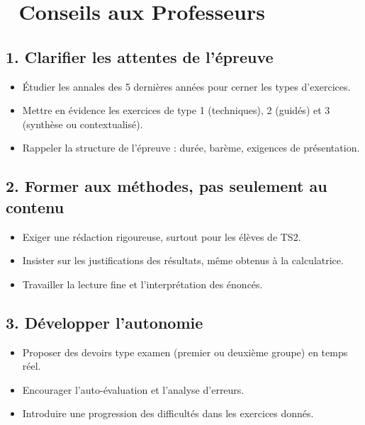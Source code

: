 








\section*{🔵 Conseils aux Professeurs}

\subsection*{1. Clarifier les attentes de l’épreuve}
\begin{itemize}[label=--]
    \item Étudier les annales des 5 dernières années pour cerner les types d’exercices.
    \item Mettre en évidence les exercices de type 1 (techniques), 2 (guidés) et 3 (synthèse ou contextualisé).
    \item Rappeler la structure de l’épreuve : durée, barème, exigences de présentation.
\end{itemize}

\subsection*{2. Former aux méthodes, pas seulement au contenu}
\begin{itemize}[label=--]
    \item Exiger une rédaction rigoureuse, surtout pour les élèves de TS2.
    \item Insister sur les justifications des résultats, même obtenus à la calculatrice.
    \item Travailler la lecture fine et l’interprétation des énoncés.
\end{itemize}

\subsection*{3. Développer l’autonomie}
\begin{itemize}[label=--]
    \item Proposer des devoirs type examen (premier ou deuxième groupe) en temps réel.
    \item Encourager l’auto-évaluation et l’analyse d’erreurs.
    \item Introduire une progression des difficultés dans les exercices donnés.
\end{itemize}

